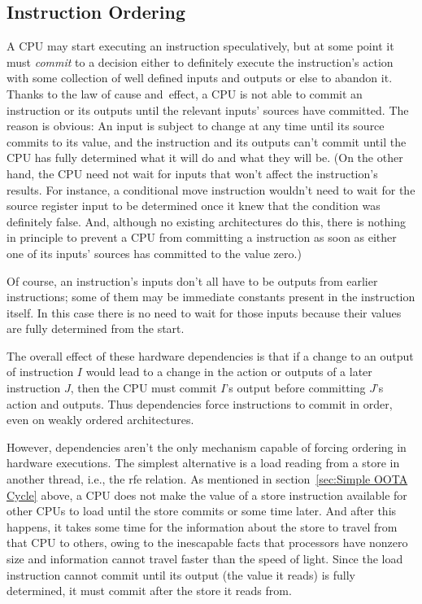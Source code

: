 \documentclass[10]{article}
\begin{document}
\subsection{Instruction Ordering}
\label{sec:Instruction Ordering}

A CPU may start executing an instruction speculatively, but at some
point it must \emph{commit} to a decision either to definitely execute the
instruction's action with some collection of well defined inputs and outputs
or else to abandon it.
Thanks to the law of cause and~effect, a CPU is not able to commit an
instruction or its outputs until the relevant inputs' sources have committed.
The reason is obvious: An input is subject to change at any time until
its source commits to its value,
and the instruction and its outputs can't commit until the CPU has fully
determined what it will do and what they will be.
(On the other hand, the CPU need not wait for inputs that won't affect
the instruction's results.
For instance, a conditional move instruction wouldn't need to wait for
the source register input to be determined once it knew that the
condition was definitely false.
And, although no existing architectures do this, there is nothing
in principle to prevent a CPU from committing a 
instruction as soon as either one of its inputs' sources has committed to the
value zero.)

Of course, an instruction's inputs don't all have to be outputs from
earlier instructions; some of them may be immediate constants present
in the instruction itself.
In this case there is no need to wait for those inputs because
their values are fully determined from the start.

The overall effect of these hardware dependencies is that if a change to an
output of instruction $I$ would lead to a change in the action or outputs of
a later instruction $J$, then the CPU must commit $I$'s output before
committing $J$'s action and outputs.
Thus dependencies force instructions to commit in order, even on
weakly ordered architectures.

However, dependencies aren't the only mechanism capable of forcing
ordering in hardware executions.
The simplest alternative is a load reading from a store in another
thread, i.e., the rfe relation.
As mentioned in section~\ref{sec:Simple OOTA Cycle} above, a CPU does
not make the value of a store instruction available for other CPUs to
load until the store commits or some time later.
And after this happens, it takes some time for the information about
the store to travel from that CPU to others, owing to the inescapable
facts that processors have nonzero size and information cannot travel
faster than the speed of light.
Since the load instruction cannot commit until its output (the value it
reads) is fully determined, it must commit after the store it reads
from.
\end{document}
